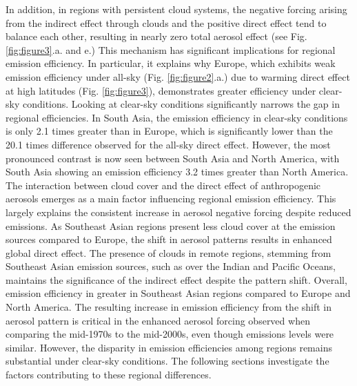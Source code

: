 \documentclass[draft]{agujournal2019}
\begin{document}
            In addition, in regions with persistent cloud systems, the negative forcing arising from the indirect effect through clouds and the positive direct effect tend to balance each other, resulting in nearly zero total aerosol effect (see Fig. \ref{fig:figure3}.a. and e.)
            This mechanism has significant implications for regional emission efficiency. In particular, it explains why Europe, which exhibits weak emission efficiency under all-sky (Fig. \ref{fig:figure2}.a.) due to warming direct effect at high latitudes (Fig. \ref{fig:figure3}), demonstrates greater efficiency under clear-sky conditions. Looking at clear-sky conditions significantly narrows the gap in regional efficiencies. 
            In South Asia, the emission efficiency in clear-sky conditions is only 2.1 times greater than in Europe, which is significantly lower than the 20.1 times difference observed for the all-sky direct effect. However, the most pronounced contrast is now seen between South Asia and North America, with South Asia showing an emission efficiency 3.2 times greater than North America.
            The interaction between cloud cover and the direct effect of anthropogenic aerosols emerges as a main factor influencing regional emission efficiency. This largely explains the consistent increase in aerosol negative forcing despite reduced emissions. As Southeast Asian regions present less cloud cover at the emission sources compared to Europe, the shift in aerosol patterns results in enhanced global direct effect. The presence of clouds in remote regions, stemming from Southeast Asian emission sources, such as over the Indian and Pacific Oceans, maintains the significance of the indirect effect despite the pattern shift. Overall, emission efficiency in greater in Southeast Asian regions compared to Europe and North America.
            The resulting increase in emission efficiency from the shift in aerosol pattern is critical in the enhanced aerosol forcing observed when comparing the mid-1970s to the mid-2000s, even though emissions levels were similar.
            However, the disparity in emission efficiencies among regions remains substantial under clear-sky conditions. The following sections investigate the factors contributing to these regional differences.
            
\end{document}
